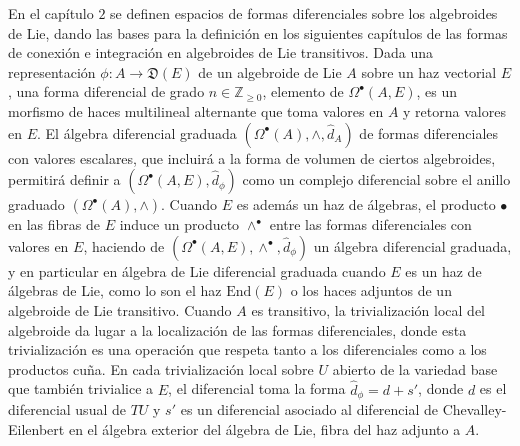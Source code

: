 En el capítulo $2$ se definen espacios de formas diferenciales sobre los algebroides de Lie, dando las bases para la definición en los siguientes capítulos de las formas de conexión e integración en algebroides de Lie transitivos. Dada una representación $\phi: A \to \mathfrak D(E)$ de un algebroide de Lie $A$ sobre un haz vectorial $E$, una forma diferencial de grado $n \in \mathbb Z_{\geq 0}$, elemento de $\Omega^\bullet(A, E)$, es un morfismo de haces multilineal alternante que toma valores en $A$ y retorna valores en $E$. El álgebra diferencial graduada $(\Omega^\bullet(A), \wedge, \hat d_A)$ de formas diferenciales con valores escalares, que incluirá a la forma de volumen de ciertos algebroides, permitirá definir a $(\Omega^\bullet(A, E), \hat d_\phi)$ como un complejo diferencial sobre el anillo graduado $(\Omega^\bullet(A), \wedge)$. Cuando $E$ es además un haz de álgebras, el producto $\bullet$ en las fibras de $E$ induce un producto $\wedge^\bullet$ entre las formas diferenciales con valores en $E$, haciendo de $(\Omega^\bullet(A, E), \wedge^\bullet, \hat d_\phi)$ un álgebra diferencial graduada, y en particular en álgebra de Lie diferencial graduada cuando $E$ es un haz de álgebras de Lie, como lo son el haz $\text{End}(E)$ o los haces adjuntos de un algebroide de Lie transitivo. Cuando $A$ es transitivo, la trivialización local del algebroide da lugar a la localización de las formas diferenciales, donde esta trivialización es una operación que respeta tanto a los diferenciales como a los productos cuña. En cada trivialización local sobre $U$ abierto de la variedad base que también trivialice a $E$, el diferencial toma la forma $\hat d_\phi = d + s'$, donde $d$ es el diferencial usual de $TU$ y $s'$ es un diferencial asociado al diferencial de Chevalley-Eilenbert en el álgebra exterior del álgebra de Lie, fibra del haz adjunto a $A$.

